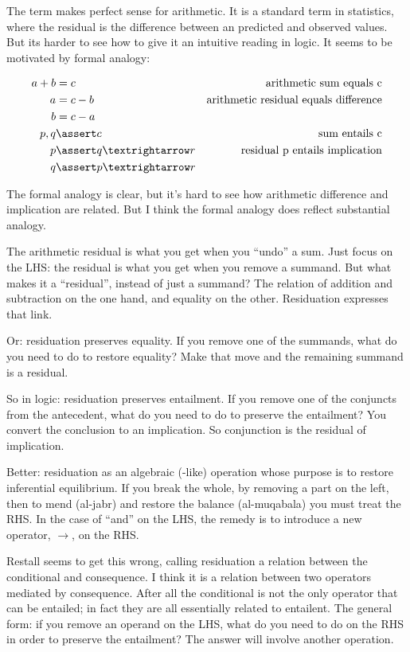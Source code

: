 \documentclass{article}
\begin{document}
The term makes perfect sense for arithmetic. It is a standard term in
statistics, where the residual is the difference between an predicted
and observed values. But its harder to see how to give it an intuitive
reading in logic. It seems to be motivated by formal analogy:

\begin{align}
  a+b &= c & \text{arithmetic sum equals c} \\
  a &= c - b & \text{arithmetic residual equals difference} \\
  b &= c - a \\
  p,q &\linfer c & \text{sum entails c} \\
  p &\linfer q→r & \text{residual p entails implication} \\
  q &\linfer p→r
\end{align}

The formal analogy is clear, but it's hard to see how arithmetic
difference and implication are related. But I think the formal analogy
does reflect substantial analogy.

The arithmetic residual is what you get when you ``undo'' a sum. Just
focus on the LHS: the residual is what you get when you remove a
summand. But what makes it a ``residual'', instead of just a summand?
The relation of addition and subtraction on the one hand, and equality
on the other. Residuation expresses that link.

Or: residuation preserves equality. If you remove one of the summands,
what do you need to do to restore equality? Make that move and the remaining summand is a residual.

So in logic: residuation preserves entailment. If you remove one of
the conjuncts from the antecedent, what do you need to do to preserve
the entailment?  You convert the conclusion to an implication. So conjunction is the residual of implication.

Better: residuation as an algebraic (-like) operation whose purpose is
to restore inferential equilibrium. If you break the whole, by
removing a part on the left, then to mend (al-jabr) and restore the
balance (al-muqabala) you must treat the RHS. In the case of ``and''
on the LHS, the remedy is to introduce a new operator, \(→\), on the
RHS.

Restall seems to get this wrong, calling residuation a relation
between the conditional and consequence. I think it is a relation
between two operators mediated by consequence. After all the
conditional is not the only operator that can be entailed; in fact
they are all essentially related to entailent. The general form: if
you remove an operand on the LHS, what do you need to do on the RHS in
order to preserve the entailment? The answer will involve another
operation.
\end{document}
